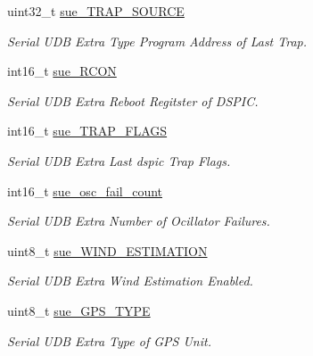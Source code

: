 \begin{DoxyCompactItemize}
\item 
uint32\+\_\+t \hyperlink{struct____mavlink__serial__udb__extra__f14__t_a08b368f934a8f7f9e973e33bd94d6ef1}{sue\+\_\+\+T\+R\+A\+P\+\_\+\+S\+O\+U\+R\+C\+E}
\begin{DoxyCompactList}\small\item\em Serial U\+D\+B Extra Type Program Address of Last Trap. \end{DoxyCompactList}\item 
int16\+\_\+t \hyperlink{struct____mavlink__serial__udb__extra__f14__t_a513aed2f8ff2e315890ef3a9634b802d}{sue\+\_\+\+R\+C\+O\+N}
\begin{DoxyCompactList}\small\item\em Serial U\+D\+B Extra Reboot Regitster of D\+S\+P\+I\+C. \end{DoxyCompactList}\item 
int16\+\_\+t \hyperlink{struct____mavlink__serial__udb__extra__f14__t_aad0af98afc265f24ac06986c32fae59f}{sue\+\_\+\+T\+R\+A\+P\+\_\+\+F\+L\+A\+G\+S}
\begin{DoxyCompactList}\small\item\em Serial U\+D\+B Extra Last dspic Trap Flags. \end{DoxyCompactList}\item 
int16\+\_\+t \hyperlink{struct____mavlink__serial__udb__extra__f14__t_ad921094b7f35d1be8344826499fc6fff}{sue\+\_\+osc\+\_\+fail\+\_\+count}
\begin{DoxyCompactList}\small\item\em Serial U\+D\+B Extra Number of Ocillator Failures. \end{DoxyCompactList}\item 
uint8\+\_\+t \hyperlink{struct____mavlink__serial__udb__extra__f14__t_a9cead9d7011390113399f7a74e6eb37a}{sue\+\_\+\+W\+I\+N\+D\+\_\+\+E\+S\+T\+I\+M\+A\+T\+I\+O\+N}
\begin{DoxyCompactList}\small\item\em Serial U\+D\+B Extra Wind Estimation Enabled. \end{DoxyCompactList}\item 
uint8\+\_\+t \hyperlink{struct____mavlink__serial__udb__extra__f14__t_a9800b2e941ec1ee9cf744ab069ea61de}{sue\+\_\+\+G\+P\+S\+\_\+\+T\+Y\+P\+E}
\begin{DoxyCompactList}\small\item\em Serial U\+D\+B Extra Type of G\+P\+S Unit. \end{DoxyCompactList}\item 

\end{DoxyCompactItemize}

